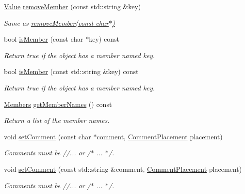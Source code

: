 \begin{DoxyCompactItemize}
\hyperlink{class_json_1_1_value}{Value} \hyperlink{class_json_1_1_value_ae1f95f7ca3906e6bcc2a7be93210ecba}{remove\-Member} (const std\-::string \&key)
\begin{DoxyCompactList}\small\item\em Same as \hyperlink{class_json_1_1_value_aa52f7873b95d29627d6e83ba96f69aaa}{remove\-Member(const char$\ast$)} \end{DoxyCompactList}\item 
bool \hyperlink{class_json_1_1_value_a196defba501d70ea2b6793afb04108e3}{is\-Member} (const char $\ast$key) const 
\begin{DoxyCompactList}\small\item\em Return true if the object has a member named key. \end{DoxyCompactList}\item 
bool \hyperlink{class_json_1_1_value_af728b5738aaa133f3aad2e39dc4f415e}{is\-Member} (const std\-::string \&key) const 
\begin{DoxyCompactList}\small\item\em Return true if the object has a member named key. \end{DoxyCompactList}\item 
\hyperlink{class_json_1_1_value_ac61bab5a465848b57610379cc07995c3}{Members} \hyperlink{class_json_1_1_value_a30fa08af88f2d0a038b22ba9f4e88b2a}{get\-Member\-Names} () const 
\begin{DoxyCompactList}\small\item\em Return a list of the member names. \end{DoxyCompactList}\item 
void \hyperlink{class_json_1_1_value_a29f3a30f7e5d3af6f38d57999bf5b480}{set\-Comment} (const char $\ast$comment, \hyperlink{namespace_json_a4fc417c23905b2ae9e2c47d197a45351}{Comment\-Placement} placement)
\begin{DoxyCompactList}\small\item\em Comments must be //... or /$\ast$ ... $\ast$/. \end{DoxyCompactList}\item 
void \hyperlink{class_json_1_1_value_a6d68a2e7d4e1e317cd9e812e12181689}{set\-Comment} (const std\-::string \&comment, \hyperlink{namespace_json_a4fc417c23905b2ae9e2c47d197a45351}{Comment\-Placement} placement)
\begin{DoxyCompactList}\small\item\em Comments must be //... or /$\ast$ ... $\ast$/. \end{DoxyCompactList}\item 

\end{DoxyCompactItemize}
